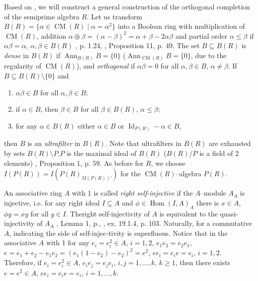\documentclass[a4paper,11pt]{article}
\DeclareMathOperator{\Id}{Id}
\DeclareMathOperator{\Hom}{Hom}
\DeclareMathOperator{\CM}{CM}
\DeclareMathOperator{\Ann}{Ann}
\begin{document}
Based on \cite{B6, BMich, BMM}, we will construct a general construction of 
the orthogonal completion of the semiprime algebra $R$. Let us transform 
${B(R)=\{\alpha\in \CM(R)\mid \alpha=\alpha^2\}}$ into a Boolean ring with 
multiplication of $\CM(R)$, addition 
${\alpha\oplus \beta=(\alpha-\beta)^2=\alpha+\beta-2 \alpha \beta}$ and 
partial order ${\alpha\leq \beta}$ if 
${\alpha \beta=\alpha}$, ${\alpha, \beta\in B(R)}$
\cite{BMich}, p. 1.24, \cite{Lamb}, Proposition 11, p. 49. The set 
${B\subseteq B(R)}$ is \emph{dense} in $B(R)$ if ${\Ann_{B(R)} B=\{0\}}$ 
(${\Ann_{\CM(R)} B=\{0\}}$, due to the regularity of $\CM(R)$), and 
\emph{orthogonal} if ${\alpha \beta=0}$ for all ${\alpha, \beta\in B}$, 
${\alpha\ne \beta}$. If ${B\subseteq B(R)\setminus \{0\}}$ and 
\begin{enumerate}

\item ${\alpha \beta\in B}$ for all ${\alpha, \beta\in B}$; 

\item if ${\alpha\in B}$, then ${\beta\in B}$ for all ${\beta\in B(R)}$, 
${\alpha\leq \beta}$; 

\item for any ${\alpha\in B(R)}$ either ${\alpha\in B}$ or 
${\Id_{P(R)}-\alpha\in B}$,

\end{enumerate}
then $B$ is an \emph{ultrafilter} in $B(R)$. Note that ultrafilters in $B(R)$ 
are exhausted by sets ${B(R)\setminus P}$,\linebreak $P$ is the maximal ideal of 
$B(R)$ ($B(R)/P$ is a field of 2 elements) \cite{Lamb}, Proposition 1, p. 59. 
As before for $R$, we choose ${I(P(R))=I(P(R)_{M(P(R))'})}$ for the 
$\CM(R)$--algebra $P(R)$.

An associative ring $A$ with 1 is called \emph{right self-injective} if the 
$A$--module $A_A$ is injective, i.e. for any right ideal ${I\subseteq A}$ 
and ${\phi\in \Hom(I, A)_A}$ there is ${x\in A}$, ${\phi y=x y}$ for all 
${y\in I}$. The\linebreak right self-injectivity of $A$ is equivalent to the 
quasi-injectivity of $A_A$ \cite{Lamb}, Lemma 1, p., 
\cite{Fe}, ex. 19.1.4, p. 103. Naturally, for a commutative $A$, indicating 
the side of self-injec-\linebreak tivity is superfluous. 
Notice that in the associative $A$ 
with 1 for any ${e_i=e_i^2\in A}$, ${i=1, 2}$, ${e_1 e_2=e_2 e_1}$, 
${e=e_1+e_2-e_1 e_2=(e_1 (1-e_2)-e_2)^2=e^2}$, ${e e_i=e_i e=e_i}$, ${i=1, 2}$. 
Therefore, if ${e_i=e_i^2\in A}$, ${e_i e_j=e_j e_i}$, 
${i, j=1, \ldots, k}$, ${k\geq 1}$, then there exists ${e=e^2\in A}$, 
${e e_i=e_i e=e_i}$, ${i=1, \ldots, k}$.
\end{document}

